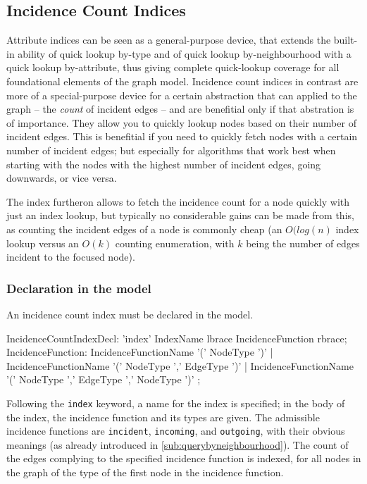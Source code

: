 \subsection{Incidence Count Indices}
Attribute indices can be seen as a general-purpose device, that extends the built-in ability of quick lookup by-type and of quick lookup by-neighbourhood with a quick lookup by-attribute, thus giving complete quick-lookup coverage for all foundational elements of the graph model.
Incidence count indices in contrast are more of a special-purpose device for a certain abstraction that can applied to the graph -- the \emph{count} of incident edges -- and are benefitial only if that abstration is of importance.
They allow you to quickly lookup nodes based on their number of incident edges.
This is benefitial if you need to quickly fetch nodes with a certain number of incident edges;
but especially for algorithms that work best when starting with the nodes with the highest number of incident edges, going downwards, or vice versa.

The index furtheron allows to fetch the incidence count for a node quickly with just an index lookup, 
but typically no considerable gains can be made from this, as counting the incident edges of a node is commonly cheap (an $O(log(n)$ index lookup versus an $O(k)$ counting enumeration, with $k$ being the number of edges incident to the focused node).

\subsubsection*{Declaration in the model}

An incidence count index must be declared in the model.

\begin{rail}
IncidenceCountIndexDecl: 'index' IndexName lbrace IncidenceFunction rbrace;
IncidenceFunction: 
  IncidenceFunctionName '(' NodeType ')' |
  IncidenceFunctionName '(' NodeType ',' EdgeType ')' |
  IncidenceFunctionName '(' NodeType ',' EdgeType ',' NodeType ')'
  ;
\end{rail}\label{IncidenceCountIndexDecl}

Following the \texttt{index} keyword, a name for the index is specified; in the body of the index, the incidence function and its types are given.
The admissible incidence functions are \texttt{incident}, \texttt{incoming}, and \texttt{outgoing}, with their obvious meanings (as already introduced in \ref{sub:querybyneighbourhood}).
The count of the edges complying to the specified incidence function is indexed, for all nodes in the graph of the type of the first node in the incidence function.

